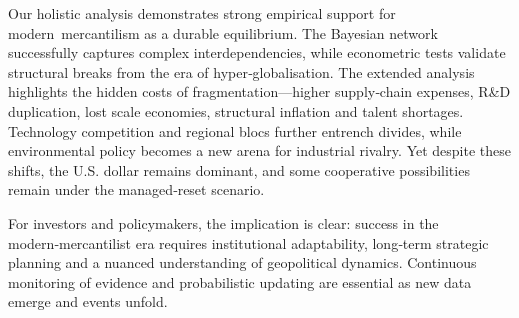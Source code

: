\documentclass[12pt]{article}
\begin{document}
Our holistic analysis demonstrates strong empirical support for modern mercantilism as a durable equilibrium.  The Bayesian network successfully captures complex interdependencies, while econometric tests validate structural breaks from the era of hyper‑globalisation.  The extended analysis highlights the hidden costs of fragmentation—higher supply‑chain expenses, R\&D duplication, lost scale economies, structural inflation and talent shortages.  Technology competition and regional blocs further entrench divides, while environmental policy becomes a new arena for industrial rivalry.  Yet despite these shifts, the U.S. dollar remains dominant, and some cooperative possibilities remain under the managed‑reset scenario.

For investors and policymakers, the implication is clear: success in the modern‑mercantilist era requires institutional adaptability, long‑term strategic planning and a nuanced understanding of geopolitical dynamics.  Continuous monitoring of evidence and probabilistic updating are essential as new data emerge and events unfold.

\pagebreak
\end{document}
